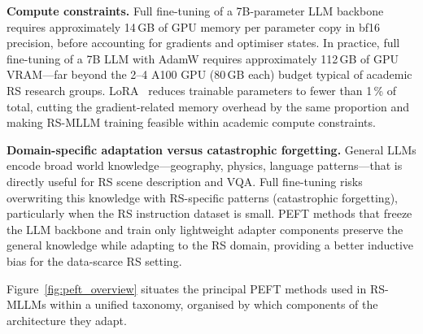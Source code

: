 \textbf{Compute constraints.}
Full fine-tuning of a 7B-parameter LLM backbone requires approximately 14\,GB
of GPU memory per parameter copy in bf16 precision, before accounting for
gradients and optimiser states. In practice, full fine-tuning of a 7B LLM
with AdamW requires approximately 112\,GB of GPU VRAM---far beyond the 2--4
A100 GPU (80\,GB each) budget typical of academic RS research groups.
LoRA~\cite{hu2022lora} reduces trainable parameters to fewer than 1\,\% of
total, cutting the gradient-related memory overhead by the same proportion and
making RS-MLLM training feasible within academic compute constraints.

\textbf{Domain-specific adaptation versus catastrophic forgetting.}
General LLMs encode broad world knowledge---geography, physics, language
patterns---that is directly useful for RS scene description and VQA. Full
fine-tuning risks overwriting this knowledge with RS-specific patterns
(catastrophic forgetting), particularly when the RS instruction dataset is small.
PEFT methods that freeze the LLM backbone and train only lightweight adapter
components preserve the general knowledge while adapting to the RS domain,
providing a better inductive bias for the data-scarce RS setting.

Figure~\ref{fig:peft_overview} situates the principal PEFT methods used in
RS-MLLMs within a unified taxonomy, organised by which components of the
architecture they adapt.

